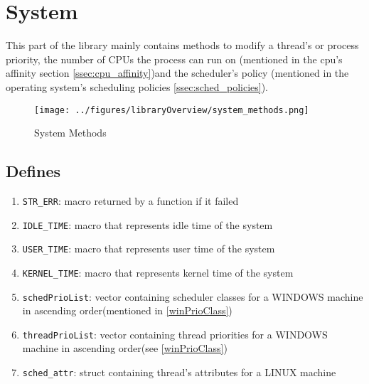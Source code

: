 \section{System}
This part of the library mainly contains methods to modify a thread's or process priority, the number of CPUs the process can run on (mentioned in the cpu's affinity section \ref{ssec:cpu_affinity})and the scheduler's policy (mentioned in the operating system's scheduling policies \ref{ssec:sched_policies}).
\begin{figure}[!htb]
	\centering
	\texttt{[image: ../figures/libraryOverview/system\_methods.png]}
	\caption{System Methods}
\end{figure}
\subsection{Defines}
\begin{enumerate}
	\item \texttt{STR\_ERR}: macro returned by a function if it failed
	\item \texttt{IDLE\_TIME}: macro that represents idle time of the system
	\item \texttt{USER\_TIME}: macro that represents user time of the system
	\item \texttt{KERNEL\_TIME}: macro that represents kernel time of the system
	\item \texttt{schedPrioList}: vector containing scheduler classes for a WINDOWS machine in ascending order(mentioned in \ref*{winPrioClass})
	\item \texttt{threadPrioList}: vector containing thread priorities for a WINDOWS machine in ascending order(see \ref*{winPrioClass})
	\item \texttt{sched\_attr}: struct containing thread's attributes for a LINUX machine\cite{linux-man-set/getattribute}
\end{enumerate}
